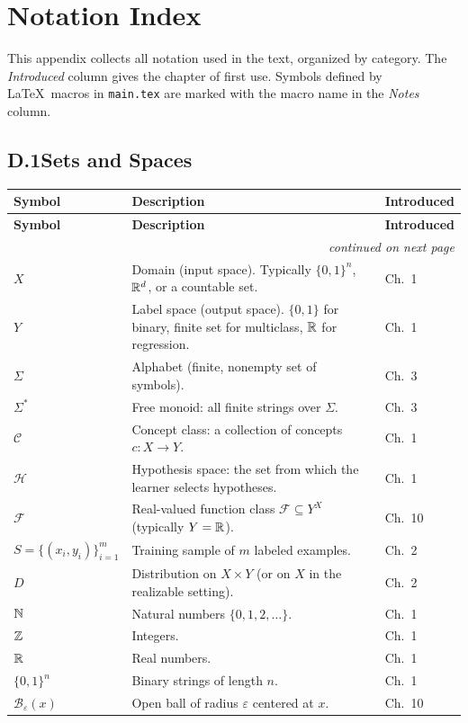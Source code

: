 \chapter{Notation Index}
\label{app:notation}

This appendix collects all notation used in the text, organized by category.
The \emph{Introduced} column gives the chapter of first use.
Symbols defined by \LaTeX\ macros in \texttt{main.tex} are marked with the macro name in the \emph{Notes} column.

\section*{D.1\quad Sets and Spaces}
\label{sec:notation-sets}

\begin{longtable}{lp{7.5cm}l}
\toprule
\textbf{Symbol} & \textbf{Description} & \textbf{Introduced} \\
\midrule
\endfirsthead
\toprule
\textbf{Symbol} & \textbf{Description} & \textbf{Introduced} \\
\midrule
\endhead
\midrule
\multicolumn{3}{r}{\footnotesize\itshape continued on next page} \\
\endfoot
\bottomrule
\endlastfoot
$X$ & Domain (input space).  Typically $\{0,1\}^n$, $\mathbb{R}^d$, or a countable set. & Ch.~1 \\
$Y$ & Label space (output space).  $\{0,1\}$ for binary, finite set for multiclass, $\mathbb{R}$ for regression. & Ch.~1 \\
$\Sigma$ & Alphabet (finite, nonempty set of symbols). & Ch.~3 \\
$\Sigma^*$ & Free monoid: all finite strings over $\Sigma$. & Ch.~3 \\
$\mathcal{C}$ & Concept class: a collection of concepts $c : X \to Y$. & Ch.~1 \\
$\mathcal{H}$ & Hypothesis space: the set from which the learner selects hypotheses. & Ch.~1 \\
$\mathcal{F}$ & Real-valued function class $\mathcal{F} \subseteq Y^X$ (typically $Y = \mathbb{R}$). & Ch.~10 \\
$S = \{(x_i, y_i)\}_{i=1}^m$ & Training sample of $m$ labeled examples. & Ch.~2 \\
$D$ & Distribution on $X \times Y$ (or on $X$ in the realizable setting). & Ch.~2 \\
$\mathbb{N}$ & Natural numbers $\{0,1,2,\ldots\}$. & Ch.~1 \\
$\mathbb{Z}$ & Integers. & Ch.~1 \\
$\mathbb{R}$ & Real numbers. & Ch.~1 \\
$\{0,1\}^n$ & Binary strings of length $n$. & Ch.~1 \\
$\mathcal{B}_\varepsilon(x)$ & Open ball of radius $\varepsilon$ centered at $x$. & Ch.~10 \\
\end{longtable}

